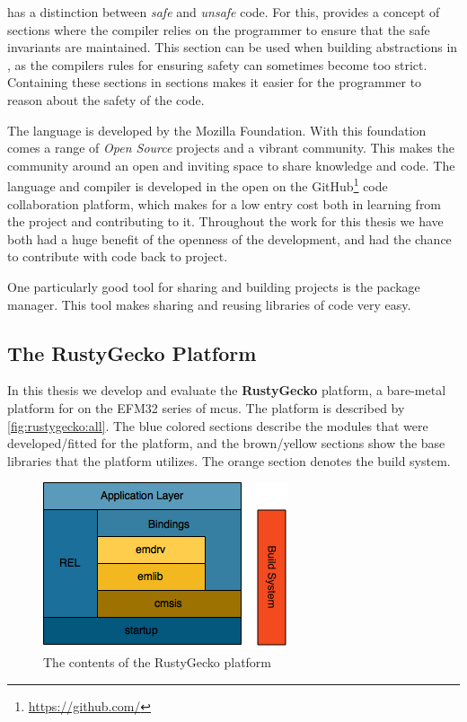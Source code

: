 {\rust} has a distinction between \emph{safe} and \emph{unsafe} code.
For this, {\rust} provides a concept of {\unsafe} sections where the compiler relies on the programmer to ensure that the safe invariants are maintained.
This section can be used when building abstractions in {\rust}, as the compilers rules for ensuring safety can sometimes become too strict.
Containing these sections in {\unsafe} sections makes it easier for the programmer to reason about the safety of the code.

The {\rust} language is developed by the Mozilla Foundation.
With this foundation comes a range of \emph{Open Source} projects and a vibrant community.
This makes the community around {\rust} an open and inviting space to share knowledge and code.
The {\rust} language and compiler is developed in the open on the GitHub\footnote{\url{https://github.com/}} code collaboration platform, which makes for a low entry cost both in learning from the project and contributing to it.
Throughout the work for this thesis we have both had a huge benefit of the openness of the development, and had the chance to contribute with code back to project.

One particularly good tool for sharing and building {\rust} projects is the {\cargo} package manager.
This tool makes sharing and reusing libraries of code very easy.

\subsection{The RustyGecko Platform}

In this thesis we develop and evaluate the \textbf{RustyGecko} platform, a bare-metal platform for {\rust} on the EFM32 series of \glspl{mcu}.
The platform is described by \autoref{fig:rustygecko:all}.
The blue colored sections describe the {\rust} modules that were developed/fitted for the platform, and the brown/yellow sections show the base {\C} libraries that the platform utilizes.
The orange section denotes the build system.

\begin{figure}[H]
  \begin{center}
    \includegraphics{figures/RustyGecko-all.png}
  \end{center}
  \caption{The contents of the RustyGecko platform}
  \label{fig:rustygecko:all}
\end{figure}

